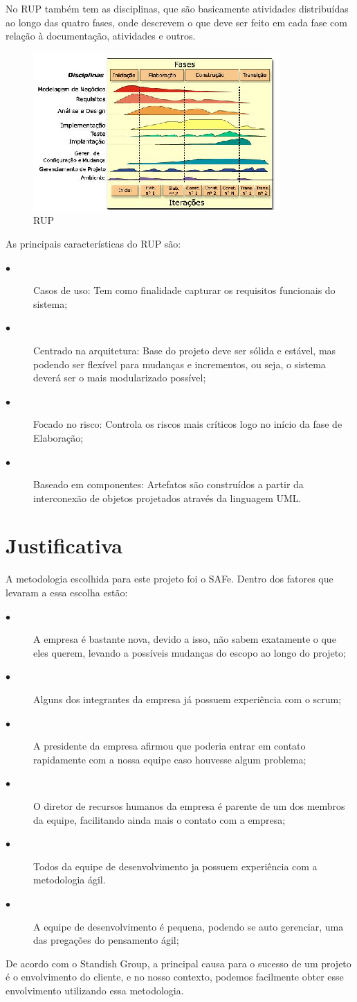  
No RUP também tem as disciplinas, que são basicamente atividades distribuídas ao longo das quatro fases, onde descrevem o que deve ser feito em cada fase com relação à documentação, atividades e outros.
\begin{figure}[!htpb]
\centering
\includegraphics[scale=2.0]{figuras/abordagem/Fases_RUP}
\caption{RUP}
\end{figure}
As principais características do RUP são:
\begin{description}
\item[$\bullet$] Casos de uso: Tem como finalidade capturar os requisitos funcionais do sistema;
\item[$\bullet$] Centrado na arquitetura: Base do projeto deve ser sólida e estável, mas podendo ser flexível para mudanças e incrementos, ou seja, o sistema deverá ser o mais modularizado possível;
\item[$\bullet$] Focado no risco: Controla os riscos mais críticos logo no início da fase de Elaboração;
\item[$\bullet$] Baseado em componentes: Artefatos são construídos a partir da interconexão de objetos projetados através da linguagem UML.
\end{description}

\section{Justificativa}
A metodologia escolhida para este projeto foi o SAFe. Dentro dos fatores que levaram a essa escolha estão:
\begin{description}
\item[$\bullet$] A empresa é bastante nova, devido a isso, não sabem exatamente o que eles querem, levando a possíveis mudanças do escopo ao longo do projeto;
\item[$\bullet$] Alguns dos integrantes da empresa já possuem experiência com o scrum;
\item[$\bullet$] A presidente da empresa afirmou que poderia entrar em contato rapidamente com a nossa equipe caso houvesse algum problema;
\item[$\bullet$] O diretor de recursos humanos da empresa é parente de um dos membros da equipe, facilitando ainda mais o contato com a empresa;
\item[$\bullet$] Todos da equipe de desenvolvimento ja possuem experiência com a metodologia ágil.
\item[$\bullet$] A equipe de desenvolvimento é pequena, podendo se auto gerenciar, uma das pregações do pensamento ágil;
\end{description}

De acordo com o Standish Group\cite{standishgroup}, a principal causa para o sucesso de um projeto é o envolvimento do cliente, e no nosso contexto, podemos facilmente obter esse envolvimento utilizando essa metodologia.
